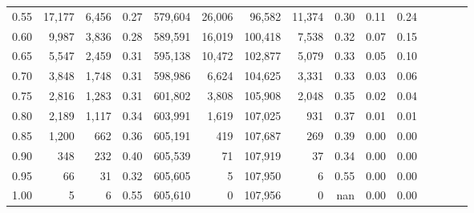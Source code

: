\begin{tabular}{rrrcrrrrrrrrrrr}
0.55 &  17,177 &   6,456 &                                       0.27 &  579,604 &   26,006 &   96,582 &   11,374 &  0.30 &  0.11 &                         0.24 \\
0.60 &   9,987 &   3,836 &                                       0.28 &  589,591 &   16,019 &  100,418 &    7,538 &  0.32 &  0.07 &                         0.15 \\
0.65 &   5,547 &   2,459 &                                       0.31 &  595,138 &   10,472 &  102,877 &    5,079 &  0.33 &  0.05 &                         0.10 \\
0.70 &   3,848 &   1,748 &                                       0.31 &  598,986 &    6,624 &  104,625 &    3,331 &  0.33 &  0.03 &                         0.06 \\
0.75 &   2,816 &   1,283 &                                       0.31 &  601,802 &    3,808 &  105,908 &    2,048 &  0.35 &  0.02 &                         0.04 \\
0.80 &   2,189 &   1,117 &                                       0.34 &  603,991 &    1,619 &  107,025 &      931 &  0.37 &  0.01 &                         0.01 \\
0.85 &   1,200 &     662 &                                       0.36 &  605,191 &      419 &  107,687 &      269 &  0.39 &  0.00 &                         0.00 \\
0.90 &     348 &     232 &                                       0.40 &  605,539 &       71 &  107,919 &       37 &  0.34 &  0.00 &                         0.00 \\
0.95 &      66 &      31 &                                       0.32 &  605,605 &        5 &  107,950 &        6 &  0.55 &  0.00 &                         0.00 \\
1.00 &       5 &       6 &                                       0.55 &  605,610 &        0 &  107,956 &        0 &   nan &  0.00 &                         0.00 \\
\bottomrule
\end{tabular}
